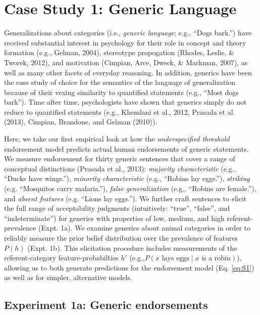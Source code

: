 \documentclass[english,floatsintext,man]{apa6}
\theoremstyle{definition}
\theoremstyle{definition}
\theoremstyle{definition}
\theoremstyle{remark}
\begin{document}
\section{Case Study 1: Generic
Language}\label{case-study-1-generic-language}

Generalizations about categories (i.e., \emph{generic language}; e.g.,
\enquote{Dogs bark.}) have received substantial interest in psychology
for their role in concept and theory formation (e.g., Gelman, 2004),
stereotype propogation (Rhodes, Leslie, \& Tworek, 2012), and motivation
(Cimpian, Arce, Dweck, \& Markman, 2007), as well as many other facets
of everyday reasoning. In addition, generics have been the case study of
choice for the semantics of the language of generalization because of
their vexing similarity to quantified statements (e.g., \enquote{Most
dogs bark}). Time after time, psychologists have shown that generics
simply do not reduce to quantified statements (e.g., Khemlani et al.,
2012, Prasada et al. (2013), Cimpian, Brandone, and Gelman (2010)).

Here, we take our first empirical look at how the \emph{underspecified
threshold} endorsement model predicts actual human endorsements of
generic statements. We measure endorsement for thirty generic sentences
that cover a range of conceptual distinctions (Prasada et al., 2013):
\emph{majority characteristic} (e.g., \enquote{Ducks have wings.}),
\emph{minority characteristic} (e.g., \enquote{Robins lay eggs.}),
\emph{striking} (e.g. \enquote{Mosquitos carry malaria.}), \emph{false
generalization} (e.g., \enquote{Robins are female.}), and \emph{absent
features} (e.g. \enquote{Lions lay eggs.}). We further craft sentences
to elicit the full range of acceptability judgments (intuitively:
\enquote{true}, \enquote{false}, and \enquote{indeterminate}) for
generics with properties of low, medium, and high referent-prevalence
(Expt. 1a). We examine generics about animal categories in order to
reliably measure the prior belief distribution over the prevalence of
features \(P(h)\) (Expt. 1b). This elicitation procedure includes
measurements of the referent-category feature-probabilties \(h'\)
(e.g.,\(P(x \text{ lays eggs} \mid x \text{ is a robin})\)), allowing us
to both generate predictions for the endorsement model (Eq. \ref{eq:S1})
as well as for simpler, alternative models.

\subsection{Experiment 1a: Generic
endorsements}\label{experiment-1a-generic-endorsements}
\end{document}
